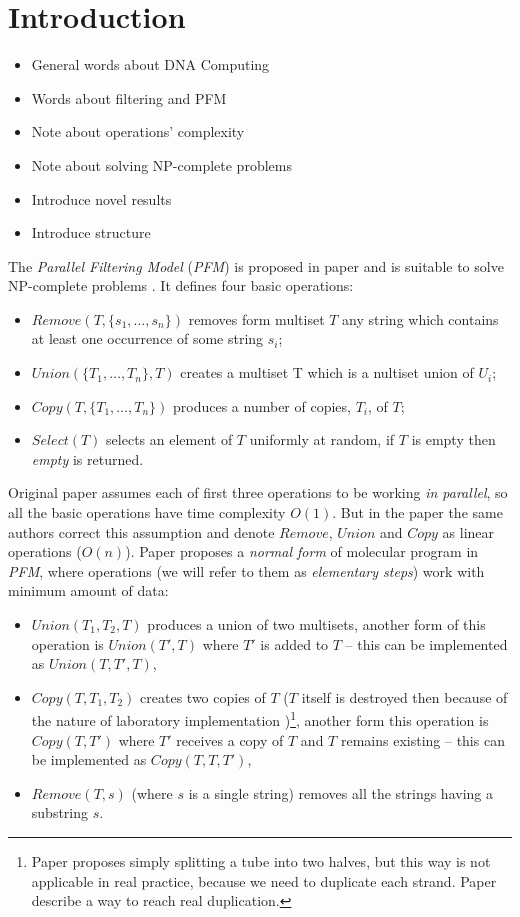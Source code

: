 \section{Introduction}
\begin{itemize}
	\item General words about DNA Computing \cite{Adleman, Lipton, PaunRozenbergSalomaa}
	\item Words about filtering and PFM \cite{Amos:1996}
	\item Note about operations' complexity \cite{Amos:1997}
	\item Note about solving NP-complete problems
	\item Introduce novel results
	\item Introduce structure
\end{itemize}


The \emph{Parallel Filtering Model} (\emph{PFM}) is proposed in paper \cite{Amos:1996} and is suitable to solve NP-complete problems \cite{Amos:1996, Katsanyi:2003}. It defines four basic operations:
\begin{itemize}
	\item $Remove(T, \{s_1, \dots, s_n\})$ removes form multiset $T$ any string which contains at least one occurrence of some string $s_i$;
	\item $Union(\{T_1, \dots, T_n\}, T)$ creates a multiset T which is a nultiset union of $U_i$;
	\item $Copy(T, \{T_1, \dots, T_n\})$ produces a number of copies, $T_i$, of $T$;
	\item $Select(T)$ selects an element of $T$ uniformly at random, if $T$ is empty then \emph{empty} is returned.
\end{itemize}
Original paper \cite{Amos:1996} assumes each of first three operations to be working \emph{in parallel}, so all the basic operations have time complexity $O(1)$. But in the paper \cite{Amos:1997} the same authors correct this assumption and denote $Remove$, $Union$ and $Copy$ as linear operations ($O(n)$). 
Paper \cite{Katsanyi:2003} proposes a \emph{normal form} of molecular program in \emph{PFM}, where operations (we will refer to them as \emph{elementary steps}) work with minimum amount of data:
\begin{itemize}
	\item $Union(T_1, T_2, T)$ produces a union of two multisets, another form of this operation is $Union(T', T)$ where $T'$ is added to $T$ -- this can be implemented as $Union(T, T', T)$,
	\item $Copy(T, T_1, T_2)$ creates two copies of $T$ ($T$ itself is destroyed then because of the nature of laboratory implementation \cite{Amos:1996})\footnote{Paper \cite{Amos:1996} proposes simply splitting a tube into two halves, but this way is not applicable in real practice, because we need to duplicate each strand. Paper \cite{SOME} describe a way to reach real duplication.}, another form this operation is $Copy(T, T')$ where $T'$ receives a copy of $T$ and $T$ remains existing -- this can be implemented as $Copy(T, T, T')$,
	\item $Remove(T, s)$ (where $s$ is a single string) removes all the strings having a substring $s$.
\end{itemize}

